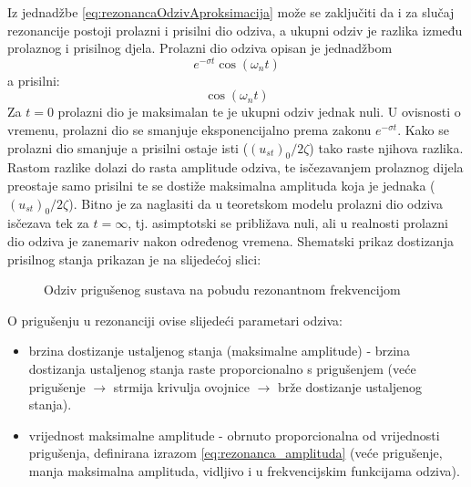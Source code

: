 Iz jednadžbe \eqref{eq:rezonancaOdzivAproksimacija} može se zaključiti da i za
slučaj rezonancije postoji prolazni i prisilni dio odziva, a ukupni odziv je razlika
između prolaznog i prisilnog djela. 
Prolazni dio odziva opisan je jednadžbom
\[
    e^{-\sigma t} \cos(\omega_n t)
\]
a prisilni:
\[
    \cos(\omega_n t)
\]
Za $t=0$ prolazni dio je maksimalan te je ukupni odziv jednak nuli. U ovisnosti o
vremenu, prolazni dio se smanjuje eksponencijalno prema zakonu $e^{-\sigma t}$. Kako
se prolazni dio smanjuje a prisilni ostaje isti ($(u_{st})_0/2\zeta$) tako raste
njihova razlika. Rastom razlike dolazi do rasta amplitude odziva, te isčezavanjem
prolaznog dijela preostaje samo prisilni te se dostiže maksimalna amplituda koja je
jednaka ($(u_{st})_0/2\zeta$). Bitno je za naglasiti da u teoretskom modelu
prolazni dio odziva isčezava tek za $t=\infty$, tj. asimptotski se približava nuli,
ali u realnosti prolazni dio odziva je zanemariv nakon određenog vremena. Shematski
prikaz dostizanja prisilnog stanja prikazan je na slijedećoj slici:
\begin{figure}[H]
     
    \caption{Odziv prigušenog sustava na pobudu rezonantnom frekvencijom}
    \label{fig:rezonanca-priguseno}
\end{figure}

O prigušenju u rezonanciji ovise slijedeći parametari odziva:
\begin{itemize}
    \item brzina dostizanje ustaljenog stanja (maksimalne amplitude) - brzina dostizanja 
        ustaljenog stanja raste proporcionalno s prigušenjem (veće prigušenje $\to$ strmija krivulja
        ovojnice $\to$ brže dostizanje ustaljenog stanja).

    \item vrijednost maksimalne amplitude - obrnuto proporcionalna od vrijednosti
        prigušenja, definirana izrazom \eqref{eq:rezonanca_amplituda}
        (veće prigušenje, manja maksimalna amplituda, vidljivo i u frekvencijskim
        funkcijama odziva).
\end{itemize}

